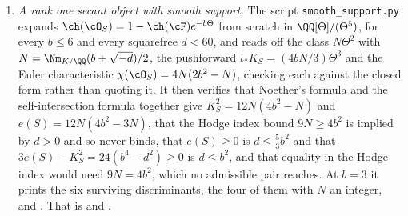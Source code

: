 \begin{enumerate}[label=\textup{(\Roman*)},leftmargin=*]
  two local models, the ideal $I=(x_{1},x_{2})\cap(x_{3},x_{4})$ and the
  complex $K=[R\to R/(x_{1},x_{2})\oplus R/(x_{3},x_{4})]$, resolved by the
  cone of the lifted map, it builds the jet chain maps $-\partial_{a}(d)$ on
  the free resolution, checks that they anticommute with the differential
  and are not null homotopic, and for every pair $(a,b)$ decides whether the
  composite is null homotopic. It finds $\Ext^{2}=k^{4}$ for $I$, with the
  four mixed products nonzero and spanning it and the same-plane products
  zero; $\Ext^{2}=k^{2}$ for $K$, with the two same-plane products nonzero
  and spanning it and the mixed products zero; anticommutation
  $a_{a}a_{b}+a_{b}a_{a}=0$ in both models; and, for $I$, the same vanishing
  pattern from the jet modules and \texttt{yonedaProduct}. This item needs
  Macaulay2 (version 1.22 with the package \texttt{Complexes}) and is not
  part of \texttt{verify\_all.py}; its transcript
  \texttt{m2/local\_products.txt} is included with the code.

\item \emph{A rank one secant object with smooth support.} The script
  \texttt{smooth\_\allowbreak support.py} expands $\ch(\cO_{S})=1-\ch(\cF)e^{-b\Theta}$
  from scratch in $\QQ[\Theta]/(\Theta^{5})$, for every $b\le6$ and every
  squarefree $d<60$, and reads off the class $N\Theta^{2}$ with
  $N=\Nm_{K/\QQ}(b+\sqrt{-d})/2$, the pushforward
  $\iota_{*}K_{S}=(4bN/3)\Theta^{3}$ and the Euler characteristic
  $\chi(\cO_{S})=4N(2b^{2}-N)$, checking each against the closed form rather
  than quoting it. It then verifies that Noether's formula and the
  self-intersection formula together give $K_{S}^{2}=12N(4b^{2}-N)$ and
  $e(S)=12N(4b^{2}-3N)$, that the Hodge index bound $9N\ge4b^{2}$ is implied
  by $d>0$ and so never binds, that $e(S)\ge0$ is $d\le\tfrac53b^{2}$ and that
  $3e(S)-K_{S}^{2}=24(b^{4}-d^{2})\ge0$ is $d\le b^{2}$, and that equality in
  the Hodge index would need $9N=4b^{2}$, which no admissible pair reaches.
  At $b=3$ it prints the six surviving discriminants, the four of them with
  $N$ an integer, and . That is
   and .


\end{enumerate}
